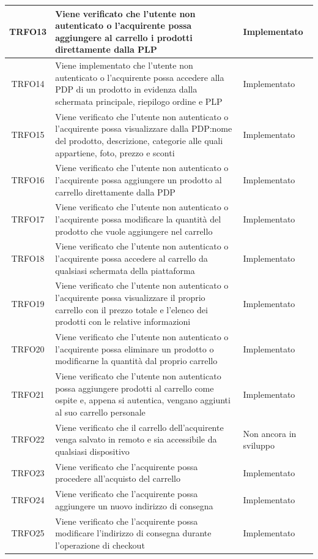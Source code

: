 \begin{longtable}{|c| C{10cm} |C{3cm}|}
	TRFO13 & Viene verificato che l'utente non autenticato o l'acquirente possa aggiungere al carrello i prodotti direttamente dalla PLP & Implementato\\ \hline
	TRFO14 & Viene implementato che l'utente non autenticato o l'acquirente possa accedere alla PDP di un prodotto in evidenza dalla schermata principale, riepilogo ordine e PLP & Implementato \\ \hline
	TRFO15 & Viene verificato che l'utente non autenticato o l'acquirente possa visualizzare dalla PDP:nome del prodotto, descrizione, categorie alle quali appartiene, foto, prezzo e sconti & Implementato \\ \hline
	TRFO16 & Viene verificato che l'utente non autenticato o l'acquirente possa aggiungere un prodotto al carrello direttamente dalla PDP  & Implementato\\ \hline
	TRFO17 & Viene verificato che l'utente non autenticato o l'acquirente possa modificare la quantità del prodotto che vuole aggiungere nel carrello & Implementato\\ \hline
	TRFO18 & Viene verificato che l'utente non autenticato o l'acquirente possa accedere al carrello da qualsiasi schermata della piattaforma & Implementato \\ \hline
	TRFO19 & Viene verificato che l'utente non autenticato o l'acquirente possa visualizzare il proprio carrello con il prezzo totale e l'elenco dei prodotti con le relative informazioni & Implementato\\ \hline
	TRFO20 & Viene verificato che l'utente non autenticato o l'acquirente possa eliminare un prodotto o modificarne la quantità dal proprio carrello & Implementato\\ \hline
	TRFO21 & Viene verificato che l'utente non autenticato possa aggiungere prodotti al carrello come ospite e, appena si autentica, vengano aggiunti al suo carrello personale & Implementato\\ \hline
	TRFO22 & Viene verificato che il carrello dell'acquirente venga salvato in remoto e sia accessibile da qualsiasi dispositivo & Non ancora in sviluppo\\ \hline
	TRFO23 & Viene verificato che l'acquirente possa procedere all'acquisto del carrello & Implementato\\ \hline
	TRFO24 & Viene verificato che l'acquirente possa aggiungere un nuovo indirizzo di consegna & Implementato\\ \hline
	TRFO25 & Viene verificato che l'acquirente possa modificare l'indirizzo di consegna durante l'operazione di checkout & Implementato\\ \hline

\end{longtable}

